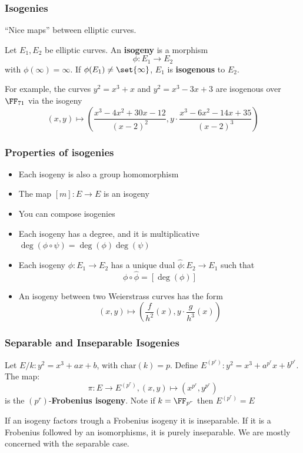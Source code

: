 \documentclass{beamer}
\begin{document}
\begin{frame}
    \frametitle{Isogenies}
    ``Nice maps'' between elliptic curves.
    \begin{definition}
        Let $E_1, E_2$ be elliptic curves. An \textbf{isogeny} is a morphism
        \[ \phi : E_1 \to E_2 \]
        with $\phi(\infty) = \infty$.
        If $\phi(E_1) \neq \set{\infty}$, $E_1$ is \textbf{isogenous} to $E_2$.
    \end{definition}
    For example, the curves $y^2 = x^3 + x$ and $y^2 = x^3 - 3x + 3$ are isogenous over $\FF_{71}$ via the isogeny 
    \[ (x, y) \mapsto \left(\frac{x^3 - 4 x^2 + 30 x -12}{(x - 2)^2}, y\cdot\frac{x^3 - 6x^2 -14x + 35}{(x - 2)^3} \right)\]
\end{frame}

\begin{frame}
    \frametitle{Properties of isogenies}

    \begin{itemize}
        \item Each isogeny is also a group homomorphism
        \item The map $[m]: E \to E$ is an isogeny
        \item You can compose isogenies
        \item Each isogeny has a degree, and it is multiplicative $\deg(\phi \circ \psi) = \deg(\phi)\deg(\psi)$
        \item Each isogeny $\phi: E_1 \to E_2$ has a unique dual $\hat{\phi}: E_2 \to E_1$ such that 
        \[ \phi \circ \hat{\phi} = [\deg(\phi)] \]
        \item An isogeny between two Weierstrass curves has the form
        \[ (x, y) \mapsto \left(\frac{f}{h^2}(x), y\cdot \frac{g}{h^3}(x) \right) \]
    \end{itemize}
\end{frame}

\begin{frame}
    \frametitle{Separable and Inseparable Isogenies}
    \begin{definition}
        Let $E/k: y^2 = x^3 + ax + b$, with $\mathrm{char}(k) = p$. Define $E^{(p^r)}: y^2 = x^3 + a^{p^r} x + b^{p^r}$.
        The map:
        \[ \pi: E \to E^{(p^r)}, (x, y) \mapsto \left(x^{p^r}, y^{p^r} \right) \]
        is the $(p^r)$-\textbf{Frobenius isogeny}. Note if $k = \FF_{p^r}$ then $E^{(p^r)} = E$
    \end{definition}
    If an isogeny factors trough a Frobenius isogeny it is inseparable. 
    If it is a Frobenius followed by an isomorphisms, it is purely inseparable.
    We are mostly  concerned with the separable case.

\end{frame}
\end{document}
